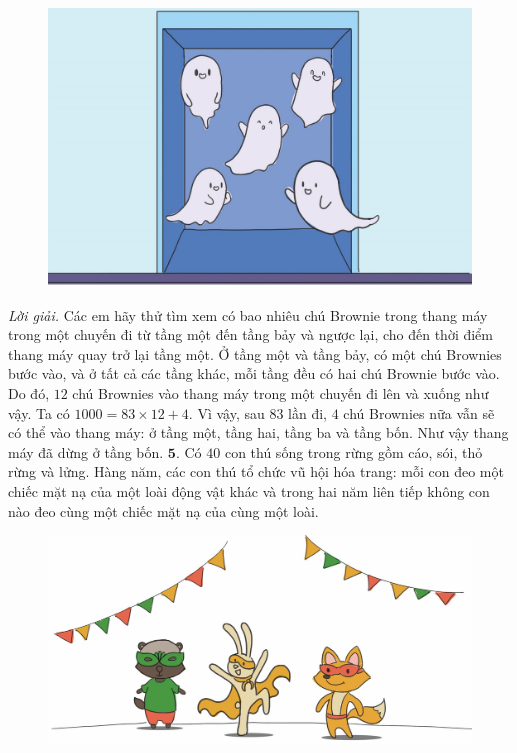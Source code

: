 \begin{multicols}{2}
	\begin{figure}[H]
		\centering
		\vspace*{-5pt}
		\captionsetup{labelformat= empty, justification=centering}
		\includegraphics[width=1\linewidth]{Pi4_bai4}
		\vspace*{-20pt}
	\end{figure}
	\textit{Lời giải.} 	Các em hãy thử tìm xem có bao nhiêu chú Brownie trong thang máy trong một chuyến đi từ tầng một đến tầng bảy và ngược lại, cho đến thời điểm thang máy quay trở lại tầng một. Ở tầng một và tầng bảy, có một chú Brownies bước vào, và ở tất cả các tầng khác, mỗi tầng đều có  hai chú Brownie bước vào. Do đó, $12$ chú Brownies vào thang máy trong một chuyến đi lên và xuống như vậy. 
	\vskip 0.1cm
	Ta có $1000 = 83 \times 12 + 4$. Vì vậy, sau $83$ lần đi, $4$ chú Brownies nữa vẫn sẽ có thể vào thang máy: ở tầng một, tầng hai, tầng ba và tầng bốn. 
	Như vậy thang máy đã dừng ở tầng bốn.
	\vskip 0.1cm
	$\pmb{5.}$ Có $40$ con thú sống trong rừng gồm cáo, sói, thỏ rừng và lửng. Hàng năm, các con thú tổ chức vũ hội hóa trang: mỗi con đeo một chiếc mặt nạ của một loài động vật khác và trong hai năm liên tiếp không con nào đeo cùng một chiếc mặt nạ của cùng một loài.
	\begin{figure}[H]
		\centering
		\vspace*{-5pt}
		\captionsetup{labelformat= empty, justification=centering}
		\includegraphics[width=1\linewidth]{Pi4_bai5}

\end{figure}
\end{multicols}
